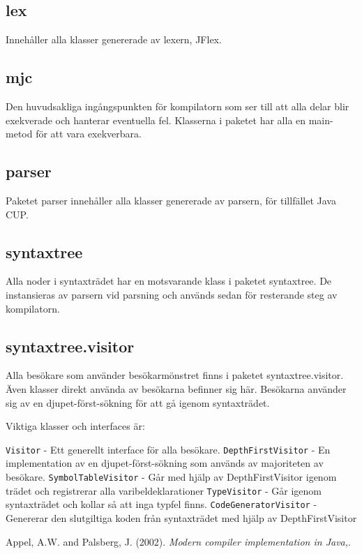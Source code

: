 \documentclass[a4paper,11pt]{article}
\renewcommand{\*}[0]{\cdot}
\begin{document}
\subsection*{lex}
Innehåller alla klasser genererade av lexern, JFlex.
\subsection*{mjc}
Den huvudsakliga ingångspunkten för kompilatorn som ser till att alla delar
blir exekverade och hanterar eventuella fel. Klasserna i paketet har alla en
main-metod för att vara exekverbara.
\subsection*{parser}
Paketet parser innehåller alla klasser genererade av parsern, för tillfället
Java CUP.
\subsection*{syntaxtree}
Alla noder i syntaxträdet har en motsvarande klass i paketet syntaxtree. De
instansieras av parsern vid parsning och används sedan för resterande steg av
kompilatorn.
\subsection*{syntaxtree.visitor}
Alla besökare som använder besökarmönstret finns i paketet syntaxtree.visitor.
Även klasser direkt använda av besökarna befinner sig här. Besökarna använder
sig av en djupet-först-sökning för att gå igenom syntaxträdet.

Viktiga klasser och interfaces är:
\begin{itemize}
\texttt{Visitor} - Ett generellt interface för alla besökare.
\texttt{DepthFirstVisitor} - En implementation av en djupet-först-sökning som används av majoriteten av besökare.
\texttt{SymbolTableVisitor} - Går med hjälp av DepthFirstVisitor igenom trädet och registrerar alla varibeldeklarationer
\texttt{TypeVisitor} - Går igenom syntaxträdet och kollar så att inga typfel finns.
\texttt{CodeGeneratorVisitor} - Genererar den slutgiltiga koden från syntaxträdet med hjälp av DepthFirstVisitor
\end{itemize}

\begin{thebibliography}{99}

        Appel, A.W. and Palsberg, J.
        (2002).
        \emph{Modern compiler implementation in Java,}.
\end{thebibliography}
\end{document}
